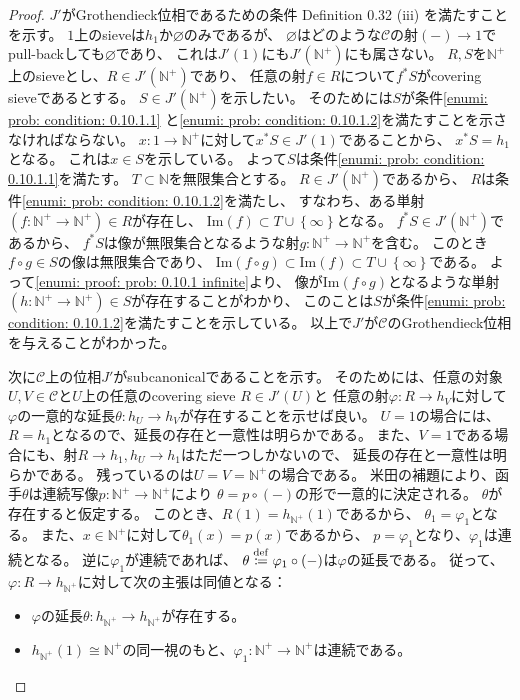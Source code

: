 \documentclass[uplatex]{jsarticle}
\theoremstyle{definition}
\renewcommand{\emptyset}{\varnothing}
\newcommand{\im}{\mathrm{Im}}
\def\N{\mathbb{N}}
\def\mcC{\mathcal{C}}
\newcommand{\dfn}{\overset{\mathrm{\tiny def}}{\coloneqq}}
\begin{document}
\begin{proof}
  \(J'\)がGrothendieck位相であるための条件 Definition 0.32 (iii) を満たすことを示す。
  \(1\)上のsieveは\(h_1\)か\(\emptyset\)のみであるが、
  \(\emptyset\)はどのような\(\mcC\)の射\((-)\to 1\)でpull-backしても\(\emptyset\)であり、
  これは\(J'(1)\)にも\(J'(\N^+)\)にも属さない。
  \(R,S\)を\(\N^+\)上のsieveとし、\(R\in J'(\N^+)\)であり、
  任意の射\(f\in R\)について\(f^*S\)がcovering sieveであるとする。
  \(S\in J'(\N^+)\)を示したい。
  そのためには\(S\)が条件\ref{enumi: prob: condition: 0.10.1.1}
  と\ref{enumi: prob: condition: 0.10.1.2}を満たすことを示さなければならない。
  \(x:1\to \N^+\)に対して\(x^*S\in J'(1)\)であることから、
  \(x^*S = h_1\)となる。
  これは\(x\in S\)を示している。
  よって\(S\)は条件\ref{enumi: prob: condition: 0.10.1.1}を満たす。
  \(T\subset \N\)を無限集合とする。
  \(R\in J'(\N^+)\)であるから、
  \(R\)は条件\ref{enumi: prob: condition: 0.10.1.2}を満たし、
  すなわち、ある単射\((f:\N^+\to \N^+)\in R\)が存在し、
  \(\im(f) \subset T\cup\left\{\infty\right\}\)となる。
  \(f^*S\in J'(\N^+)\)であるから、
  \(f^*S\)は像が無限集合となるような射\(g:\N^+\to \N^+\)を含む。
  このとき\(f\circ g\in S\)の像は無限集合であり、
  \(\im(f\circ g)\subset \im(f) \subset T\cup\left\{\infty\right\}\)である。
  よって\ref{enumi: proof: prob: 0.10.1 infinite}より、
  像が\(\im(f\circ g)\)となるような単射\((h:\N^+\to \N^+)\in S\)が存在することがわかり、
  このことは\(S\)が条件\ref{enumi: prob: condition: 0.10.1.2}を満たすことを示している。
  以上で\(J'\)が\(\mcC\)のGrothendieck位相を与えることがわかった。

  次に\(\mcC\)上の位相\(J'\)がsubcanonicalであることを示す。
  そのためには、任意の対象\(U,V\in \mcC\)と\(U\)上の任意のcovering sieve \(R\in J'(U)\)と
  任意の射\(\varphi: R\to h_V\)に対して
  \(\varphi\)の一意的な延長\(\theta:h_U\to h_V\)が存在することを示せば良い。
  \(U = 1\)の場合には、\(R = h_1\)となるので、延長の存在と一意性は明らかである。
  また、\(V=1\)である場合にも、射\(R\to h_1, h_U\to h_1\)はただ一つしかないので、
  延長の存在と一意性は明らかである。
  残っているのは\(U=V=\N^+\)の場合である。
  米田の補題により、函手\(\theta\)は連続写像\(p:\N^+\to \N^+\)により
  \(\theta = p\circ (-)\)の形で一意的に決定される。
  \(\theta\)が存在すると仮定する。
  このとき、\(R(1)=h_{\N^+}(1)\)であるから、
  \(\theta_1 = \varphi_1\)となる。
  また、\(x\in \N^+\)に対して\(\theta_1(x)=p(x)\)であるから、
  \(p=\varphi_1\)となり、\(\varphi_1\)は連続となる。
  逆に\(\varphi_1\)が連続であれば、
  \(\theta\dfn \varphi_1\circ (-)\)は\(\varphi\)の延長である。
  従って、\(\varphi:R\to h_{\N^+}\)に対して次の主張は同値となる：
  \begin{itemize}
    \item
    \(\varphi\)の延長\(\theta:h_{\N^+}\to h_{\N^+}\)が存在する。
    \item
    \(h_{\N^+}(1)\cong\N^+\)の同一視のもと、\(\varphi_1:\N^+\to \N^+\)は連続である。
  \end{itemize}


\end{proof}
\end{document}
